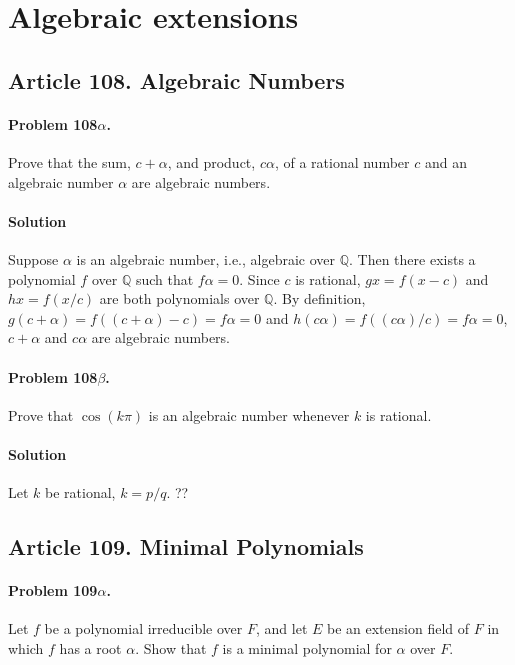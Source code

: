 \section{Algebraic extensions}

\subsection{Article 108. Algebraic Numbers}

\paragraph{Problem 108$\alpha$.}
Prove that the sum, $c + \alpha$, and product, $c\alpha$, of a rational number
$c$ and an algebraic number $\alpha$ are algebraic numbers.

\paragraph*{Solution}
Suppose $\alpha$ is an algebraic number, i.e., algebraic over $\mathbb{Q}$. Then
there exists a polynomial $f$ over $\mathbb{Q}$ such that $f\alpha = 0$. Since
$c$ is rational, $gx = f(x-c)$ and $hx = f(x/c)$ are both polynomials over
$\mathbb{Q}$. By definition, $g(c+\alpha) = f((c+\alpha)-c) = f\alpha = 0$
and $h(c\alpha) = f((c\alpha)/c) = f\alpha = 0$, $c+\alpha$ and $c\alpha$
are algebraic numbers.

\paragraph{Problem 108$\beta$.}
Prove that $\cos (k\pi)$ is an algebraic number whenever $k$ is rational.

\paragraph*{Solution}
Let $k$ be rational, $k = p/q$. ??

\subsection{Article 109. Minimal Polynomials}

\paragraph{Problem 109$\alpha$.}
Let $f$ be a polynomial irreducible over $F$, and let $E$ be an extension
field of $F$ in which $f$ has a root $\alpha$. Show that $f$ is a minimal
polynomial for $\alpha$ over $F$.

